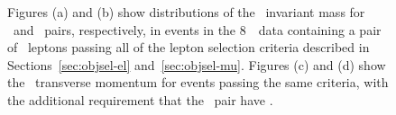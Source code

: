 \begin{figure}[h]
{        }
    \caption[Dilepton invariant mass and transverse momentum in the 8~\tev\
    data. ]
    {Figures (a) and (b) show distributions of the \dilepton\ invariant mass for \dielectron\ and 
     \dimuon\ pairs, respectively, in events in the 8~\tev\ data containing a pair of
    \ossf\ leptons passing all of the lepton selection criteria described
    in Sections~\ref{sec:objsel-el} and~\ref{sec:objsel-mu}. Figures (c) and (d) show the \dilepton\ transverse momentum for
    events passing the same criteria, with the additional requirement that the
    \dilepton\ pair have \sstooos. 
    }
\label{fig:dilep-mass-pt-eight}
\end{figure}

